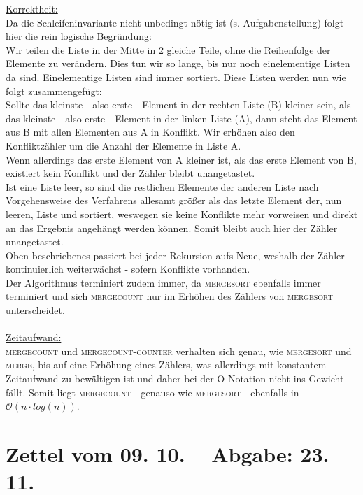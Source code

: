 \documentclass{article}
\begin{document}
    \underline{Korrektheit:}\\
    Da die Schleifeninvariante nicht unbedingt nötig ist (s. Aufgabenstellung) folgt hier die rein logische Begründung:\\
    Wir teilen die Liste in der Mitte in 2 gleiche Teile, ohne die Reihenfolge der Elemente zu verändern.
    Dies tun wir so lange, bis nur noch einelementige Listen da sind.
    Einelementige Listen sind immer sortiert.
    Diese Listen werden nun wie folgt zusammengefügt:\\
    Sollte das kleinste - also erste - Element in der rechten Liste (B) kleiner sein, als das kleinste - also erste - Element in der linken Liste (A), dann steht das Element aus B mit allen Elementen aus A in Konflikt.
    Wir erhöhen also den Konfliktzähler um die Anzahl der Elemente in Liste A.\\
    Wenn allerdings das erste Element von A kleiner ist, als das erste Element von B, existiert kein Konflikt und der Zähler bleibt unangetastet.\\
    Ist eine Liste leer, so sind die restlichen Elemente der anderen Liste nach Vorgehensweise des Verfahrens allesamt größer als das letzte Element der, nun leeren, Liste und sortiert, weswegen sie keine Konflikte mehr vorweisen und direkt an das Ergebnis angehängt werden können.
    Somit bleibt auch hier der Zähler unangetastet.\\
    Oben beschriebenes passiert bei jeder Rekursion aufs Neue, weshalb der Zähler kontinuierlich weiterwächst - sofern Konflikte vorhanden.\\
    Der Algorithmus terminiert zudem immer, da \textsc{mergesort} ebenfalls immer terminiert und sich \textsc{mergecount} nur im Erhöhen des Zählers von \textsc{mergesort} unterscheidet.\\
    \\
    \underline{Zeitaufwand:}\\
    \textsc{mergecount} und \textsc{mergecount-counter} verhalten sich genau, wie \textsc{mergesort} und \textsc{merge}, bis auf eine Erhöhung eines Zählers, was allerdings mit konstantem Zeitaufwand zu bewältigen ist und daher bei der O-Notation nicht ins Gewicht fällt.
    Somit liegt \textsc{mergecount} - genauso wie \textsc{mergesort} - ebenfalls in $\mathcal{O}(n\cdot log(n))$.

\newpage
\section{Zettel vom 09. 10. -- Abgabe: 23. 11.}
\end{document}
